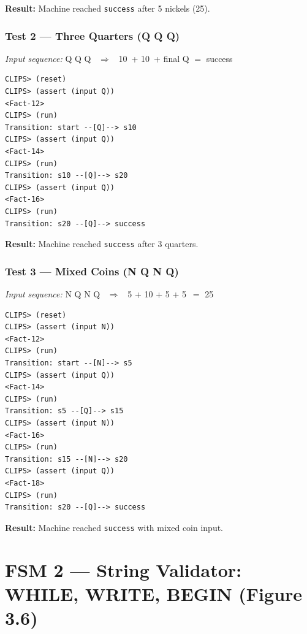 \documentclass[12pt,a4paper]{article}
\begin{document}
\begin{successbox}
\textbf{Result:} Machine reached \texttt{success} after 5 nickels (25\textcent). \checkmark
\end{successbox}

\subsubsection*{Test 2 --- Three Quarters (Q Q Q)}

\textit{Input sequence:} Q Q Q \ $\Rightarrow$ \ 10\textcent\ + 10\textcent\ + final Q $=$ success

\begin{lstlisting}[style=terminalStyle]
CLIPS> (reset)
CLIPS> (assert (input Q))
<Fact-12>
CLIPS> (run)
Transition: start --[Q]--> s10
CLIPS> (assert (input Q))
<Fact-14>
CLIPS> (run)
Transition: s10 --[Q]--> s20
CLIPS> (assert (input Q))
<Fact-16>
CLIPS> (run)
Transition: s20 --[Q]--> success
\end{lstlisting}

\begin{successbox}
\textbf{Result:} Machine reached \texttt{success} after 3 quarters. \checkmark
\end{successbox}

\subsubsection*{Test 3 --- Mixed Coins (N Q N Q)}

\textit{Input sequence:} N Q N Q \ $\Rightarrow$ \ 5 + 10 + 5 + 5\textcent\ $=$ 25\textcent

\begin{lstlisting}[style=terminalStyle]
CLIPS> (reset)
CLIPS> (assert (input N))
<Fact-12>
CLIPS> (run)
Transition: start --[N]--> s5
CLIPS> (assert (input Q))
<Fact-14>
CLIPS> (run)
Transition: s5 --[Q]--> s15
CLIPS> (assert (input N))
<Fact-16>
CLIPS> (run)
Transition: s15 --[N]--> s20
CLIPS> (assert (input Q))
<Fact-18>
CLIPS> (run)
Transition: s20 --[Q]--> success
\end{lstlisting}

\begin{successbox}
\textbf{Result:} Machine reached \texttt{success} with mixed coin input. \checkmark
\end{successbox}

\newpage
\section{FSM 2 --- String Validator: WHILE, WRITE, BEGIN (Figure 3.6)}
\end{document}
